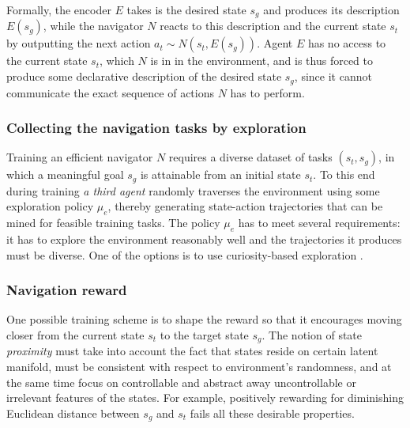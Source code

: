 \documentclass{article}
\begin{document}
Formally, the encoder $E$ takes is the desired state $s_g$ and produces its description $E(s_g)$, while the navigator $N$ reacts to this description and the current state $s_t$ by outputting the next action $a_t \sim N(s_t, E(s_g))$. Agent $E$ has no access to the current state $s_t$, which $N$ is in in the environment, and is thus forced to produce some declarative description of the desired state $s_g$, since it cannot communicate the exact sequence of actions $N$ has to perform.

\subsubsection{Collecting the navigation tasks by exploration}

Training an efficient navigator $N$ requires a diverse dataset of tasks $(s_t, s_g)$, in which a meaningful goal $s_g$ is attainable from an initial state $s_t$. To this end during training \emph{a third agent} randomly traverses the environment using some exploration policy $\mu_e$, thereby generating state-action trajectories that can be mined for feasible training tasks. The policy $\mu_e$ has to meet several requirements: it has to explore the environment reasonably well and the trajectories it produces must be diverse. One of the options is to use curiosity-based exploration \citep{pathak_curiosity-driven_2017,burda_exploration_2019}.

\subsubsection{Navigation reward}
\label{ssub:navigation_reward}

One possible training scheme is to shape the reward so that it encourages moving closer from the current state $s_t$ to the target state $s_g$. The notion of state \emph{proximity} must take into account the fact that states reside on certain latent manifold, must be consistent with respect to environment's randomness, and at the same time focus on controllable and abstract away uncontrollable or irrelevant features of the states. For example, positively rewarding for diminishing Euclidean distance between $s_g$ and $s_t$ fails all these desirable properties.
\end{document}
